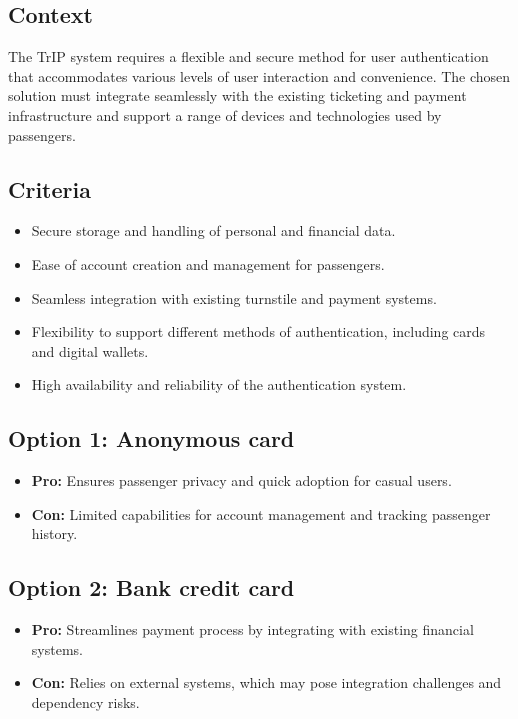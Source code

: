 \subsection*{Context}
The TrIP system requires a flexible and secure method for user authentication that accommodates various levels of user interaction and convenience. The chosen solution must integrate seamlessly with the existing ticketing and payment infrastructure and support a range of devices and technologies used by passengers.

\subsection*{Criteria}
\begin{itemize}
    \item Secure storage and handling of personal and financial data.
    \item Ease of account creation and management for passengers.
    \item Seamless integration with existing turnstile and payment systems.
    \item Flexibility to support different methods of authentication, including cards and digital wallets.
    \item High availability and reliability of the authentication system.
\end{itemize}

\subsection*{Option 1: Anonymous card}
\begin{itemize}
    \item \textbf{Pro:} Ensures passenger privacy and quick adoption for casual users.
    \item \textbf{Con:} Limited capabilities for account management and tracking passenger history.
\end{itemize}

\subsection*{Option 2: Bank credit card}
\begin{itemize}
    \item \textbf{Pro:} Streamlines payment process by integrating with existing financial systems.
    \item \textbf{Con:} Relies on external systems, which may pose integration challenges and dependency risks.
\end{itemize}

